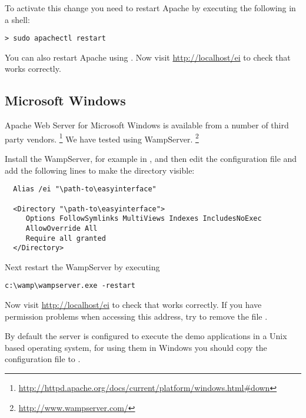 \medskip
\noindent
To activate this change you need to restart Apache by executing the
following in a shell:

\medskip
\begin{lstlisting}
> sudo apachectl restart
\end{lstlisting}

\medskip
\noindent
You can also restart Apache using
.
Now visit \url{http://localhost/ei} to check that \ei works
correctly.

\subsection{Microsoft Windows}\label{ch:installation:installing-server:windows}

Apache Web Server for Microsoft Windows is available from a number of
third party vendors.%
\footnote{\url{http://httpd.apache.org/docs/current/platform/windows.html\#down}}
We have tested \ei using WampServer.%
\footnote{\url{http://www.wampserver.com/}}

Install the WampServer, for example in , and then edit
the configuration file
 and add the following
lines to make the  directory visible:

\medskip
\begin{lstlisting}
  Alias /ei "\path-to\easyinterface"

  <Directory "\path-to\easyinterface">
     Options FollowSymlinks MultiViews Indexes IncludesNoExec
     AllowOverride All
     Require all granted
  </Directory>
\end{lstlisting}

\medskip
\noindent
Next restart the WampServer by executing

\medskip
\begin{lstlisting}
c:\wamp\wampserver.exe -restart
\end{lstlisting}

\medskip
\noindent
Now visit \url{http://localhost/ei} to check that \ei works
correctly. If you have permission problems when accessing this address,
try to remove the file .

By default the server is configured to execute the demo applications
in a Unix based operating system, for using them in Windows you should
copy the configuration file
 to
.

